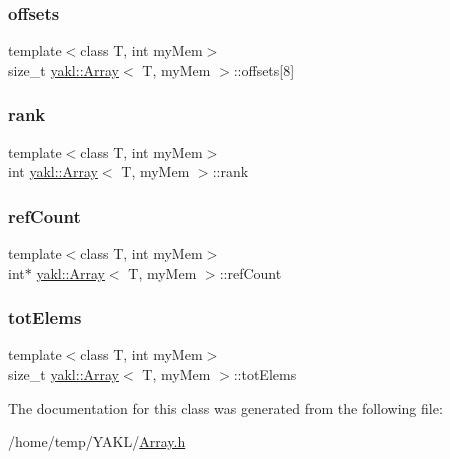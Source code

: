 \mbox{\label{classyakl_1_1Array_a761f9e20b65f283252bdb4dccaa3aa82}} 
\subsubsection{\texorpdfstring{offsets}{offsets}}
{\footnotesize\ttfamily template$<$class T, int my\+Mem$>$ \\
size\+\_\+t \hyperlink{classyakl_1_1Array}{yakl\+::\+Array}$<$ T, my\+Mem $>$\+::offsets\mbox{[}8\mbox{]}}

\mbox{\label{classyakl_1_1Array_a3c50a377d5370bbff2ad29db3c5f544d}} 
\subsubsection{\texorpdfstring{rank}{rank}}
{\footnotesize\ttfamily template$<$class T, int my\+Mem$>$ \\
int \hyperlink{classyakl_1_1Array}{yakl\+::\+Array}$<$ T, my\+Mem $>$\+::rank}

\mbox{\label{classyakl_1_1Array_a4fce1cc9b063282722194c220b8a36b5}} 
\subsubsection{\texorpdfstring{ref\+Count}{refCount}}
{\footnotesize\ttfamily template$<$class T, int my\+Mem$>$ \\
int$\ast$ \hyperlink{classyakl_1_1Array}{yakl\+::\+Array}$<$ T, my\+Mem $>$\+::ref\+Count}

\mbox{\label{classyakl_1_1Array_a82f958312103b5daa01bab785ed9a47e}} 
\subsubsection{\texorpdfstring{tot\+Elems}{totElems}}
{\footnotesize\ttfamily template$<$class T, int my\+Mem$>$ \\
size\+\_\+t \hyperlink{classyakl_1_1Array}{yakl\+::\+Array}$<$ T, my\+Mem $>$\+::tot\+Elems}



The documentation for this class was generated from the following file\+:\begin{DoxyCompactItemize}
\item 
/home/temp/\+Y\+A\+K\+L/\hyperlink{Array_8h}{Array.\+h}\end{DoxyCompactItemize}

